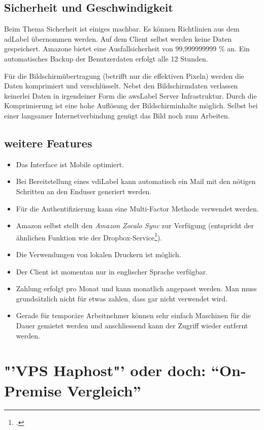\subsection{Sicherheit und Geschwindigkeit}
Beim Thema Sicherheit ist einiges machbar.
Es können Richtlinien aus dem \Gls{adLabel} übernommen werden.
Auf dem Client selbst werden keine Daten gespeichert.
Amazone bietet eine Ausfallsicherheit von 99,999999999 \% an.
Ein automatisches Backup der Benutzerdaten erfolgt alle 12 Stunden.

Für die Bildschirmübertragung (betrifft nur die effektiven Pixeln) werden die Daten komprimiert und verschlüsselt.
Nebst den Bildschirmdaten verlassen keinerlei Daten in irgendeiner Form die \Gls{awsLabel} Server Infrastruktur.
Durch die Komprimierung ist eine hohe Auflösung der Bildschirminhalte möglich. Selbst bei einer langsamer Internetverbindung genügt das Bild noch zum Arbeiten.

\subsection{weitere Features}
\begin{itemize}
	\item Das Interface ist Mobile optimiert.
	\item Bei Bereitstellung eines \Gls{vdiLabel} kann automatisch ein Mail mit den nötigen Schritten an den Enduser generiert werden.
	\item Für die Authentifizierung kann eine Multi-Factor Methode verwendet werden.
	\item Amazon selbst stellt den \textit{Amazon Zocalo Sync} zur Verfügung (entspricht der ähnlichen Funktion wie der Dropbox-Service\footcite{Dropbox_2014-11-15}).
	\item Die Verwendungen von lokalen Druckern ist möglich.
	\item Der Client ist momentan nur in englischer Sprache verfügbar.
	\item Zahlung erfolgt pro Monat und kann monatlich angepasst werden. Man muss grundsätzlich nicht für etwas zahlen, dass gar nicht verwendet wird.
	\item Gerade für temporäre Arbeitnehmer können sehr einfach Maschinen für die Dauer gemietet werden und anschliessend kann der Zugriff wieder entfernt werden.
\end{itemize}





\section{"'VPS Haphost"' oder doch: "`On-Premise Vergleich"'}
